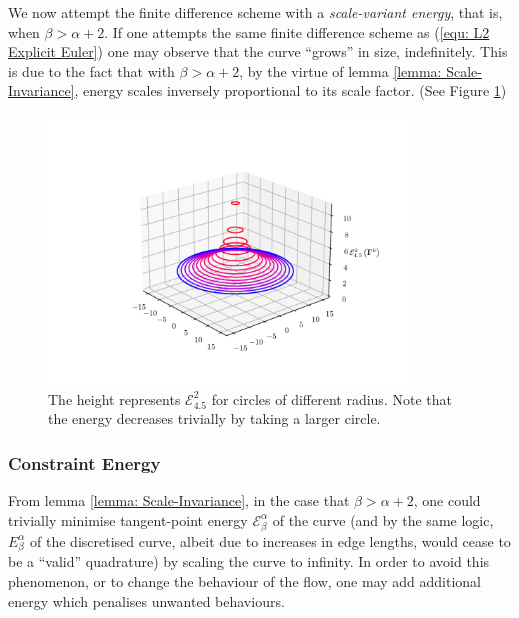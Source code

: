 \documentclass[../dissertation.tex]{subfiles}
\begin{document}
We now attempt the finite difference scheme with a \textit{scale-variant energy}, that is, when $\beta > \alpha + 2$. 
If one attempts the same finite difference scheme as (\ref{equ: L2 Explicit Euler})
one may observe that the curve ``grows'' in size, indefinitely.
This is due to the fact that with $\beta > \alpha + 2$,
by the virtue of lemma \ref{lemma: Scale-Invariance},
energy scales inversely proportional to its scale factor.
(See Figure \ref{fig: Scale Variant})
\begin{figure}[tbp]
    \centering
    \includegraphics[width=0.85\textwidth]{sections/unknottingCurveImgs/scaleVariant}
    \caption{The height represents $\mathcal{E}_{4.5}^{2}$ for circles of different radius. Note that the energy decreases trivially by taking a larger circle.}
    \label{fig: Scale Variant}
\end{figure}
\subsubsection{Constraint Energy}
From lemma \ref{lemma: Scale-Invariance}, in the case that $\beta > \alpha + 2$,
one could trivially minimise tangent-point energy $\mathcal{E}_{\beta}^{\alpha}$ of the curve 
(and by the same logic, $E_{\beta}^{\alpha}$ of the discretised curve, albeit due to increases in edge lengths, would cease to be a ``valid'' quadrature)
by scaling the curve to infinity.
In order to avoid this phenomenon, or to change the behaviour of the flow, one may add additional energy which penalises unwanted behaviours.
\end{document}
